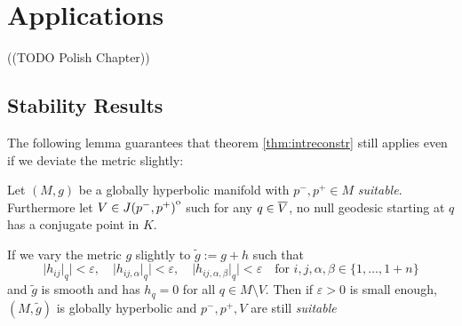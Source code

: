 \chapter{Applications}
((TODO Polish Chapter))
\section{Stability Results}

The following lemma guarantees that theorem \ref{thm:intreconstr} still applies even if we deviate the metric slightly:
\begin{lemma}
    Let $(M,g)$ be a globally hyperbolic manifold with $p^-,p^+\in M$ \emph{suitable}. Furthermore let $V\in {\kern0ptJ(p^-,p^+)}^{\mathrm{o}}$ such for any $q\in {\overline{V}}$, no null geodesic starting at $q$ has a conjugate point in $K$.

    If we vary the metric $g$ slightly to $\widetilde{g}:=g+h$ such that 
    \[
        \lvert h_{ij}\rvert_q \rvert <\varepsilon, \quad \lvert h_{ij,\alpha}\rvert_q \rvert <\varepsilon, \quad \lvert h_{ij,\alpha,\beta}\rvert_q \rvert <\varepsilon \quad \text{for }i,j,\alpha,\beta\in \{1,\dots, 1+n\}
    \]
    and $\widetilde{g}$ is smooth and has $h_q=0$ for all $q\in M\setminus V$. Then if $\varepsilon>0$ is small enough, $(M,\widetilde{g})$ is globally hyperbolic and $p^-,p^+,V$ are still \emph{suitable}
\end{lemma}
